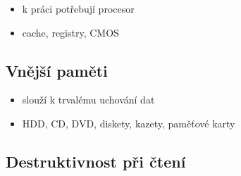 \documentclass[a4paper,12pt]{article}
\providecommand{\tightlist}{%
\setlength{\itemsep}{0pt}\setlength{\parskip}{0pt}}
\begin{document}
\begin{itemize}
\tightlist
\item k práci potřebují procesor
\item cache, registry, CMOS
\end{itemize}

\subsection{Vnější paměti}

\begin{itemize}
\tightlist
\item slouží k trvalému uchování dat
\item HDD, CD, DVD, diskety, kazety, paměťové karty
\end{itemize}

\subsection{Destruktivnost při čtení}
\end{document}
